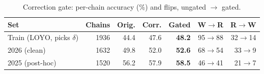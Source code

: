 \begin{table}[!t]
\centering
\footnotesize
\caption{Correction gate: per-chain accuracy (\%) and flips, ungated $\to$ gated.}
\label{tab:gate}
\setlength{\tabcolsep}{3.5pt}
\begin{tabular}{lrrrrrr}
\toprule
Set & Chains & Orig. & Corr. & Gated & W$\to$R & R$\to$W \\
\midrule
Train (LOYO, picks $\delta$) & 1936 & 44.4 & 47.6 & \textbf{48.2} & 95$\to$88 & 32$\to$14 \\
2026 (clean) & 1632 & 49.8 & 52.0 & \textbf{52.6} & 68$\to$54 & 33$\to$9 \\
2025 (post-hoc) & 1520 & 56.2 & 57.9 & \textbf{58.5} & 46$\to$41 & 21$\to$7 \\
\bottomrule
\end{tabular}
\end{table}
